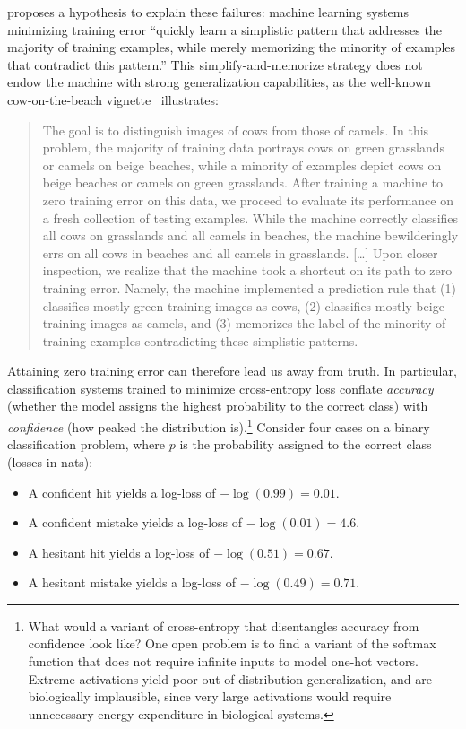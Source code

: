 \citet{tip} proposes a hypothesis to explain these failures: machine learning systems minimizing training error ``quickly learn a simplistic pattern that addresses the majority of training examples, while merely memorizing the minority of examples that contradict this pattern.'' This simplify-and-memorize strategy does not endow the machine with strong generalization capabilities, as the well-known cow-on-the-beach vignette~\citep{beery2018recognition} illustrates:
 \begin{quote}
  The goal is to distinguish images of cows from those of camels. In this problem, the majority of training data portrays cows on green grasslands or camels on beige beaches, while a minority of examples depict cows on beige beaches or camels on green grasslands. After training a machine to zero training error on this data, we proceed to evaluate its performance on a fresh collection of testing examples. While the machine correctly classifies all cows on grasslands and all camels in beaches, the machine bewilderingly errs on all cows in beaches and all camels in grasslands. [\ldots] Upon closer inspection, we realize that the machine took a shortcut on its path to zero training error. Namely, the machine implemented a prediction rule that (1) classifies mostly green training images as cows, (2) classifies mostly beige training images as camels, and (3) memorizes the label of the minority of training examples contradicting these simplistic patterns. \citep[p. 10]{tip}
\end{quote}

Attaining zero training error can therefore lead us away from truth. In particular, classification systems trained to minimize cross-entropy loss conflate \emph{accuracy} (whether the model assigns the highest probability to the correct class) with \emph{confidence} (how peaked the distribution is).\footnote{What would a variant of cross-entropy that disentangles accuracy from confidence look like? One open problem is to find a variant of the softmax function that does not require infinite inputs to model one-hot vectors. Extreme activations yield poor out-of-distribution generalization, and are biologically implausible, since very large activations would require unnecessary energy expenditure in biological systems.} Consider four cases on a binary classification problem, where $p$ is the probability assigned to the correct class (losses in nats):
\begin{itemize}
    \item A confident hit yields a log-loss of $-\log(0.99) = 0.01$.
    \item A confident mistake yields a log-loss of $-\log(0.01) = 4.6$.
    \item A hesitant hit yields a log-loss of $-\log(0.51) = 0.67$.
    \item A hesitant mistake yields a log-loss of $-\log(0.49) = 0.71$.
\end{itemize}

